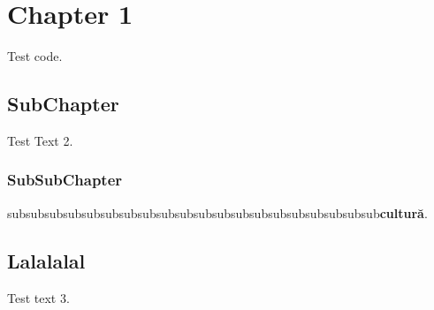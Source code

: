 \section{Chapter 1}

Test code.



  \subsection{SubChapter}
  Test Text 2.

    \subsubsection{SubSubChapter}
    subsubsubsubsubsubsubsubsubsubsubsubsubsubsubsubsubsubsubsub\textbf{cultură}.

  \subsection{Lalalalal}
  Test text 3.
